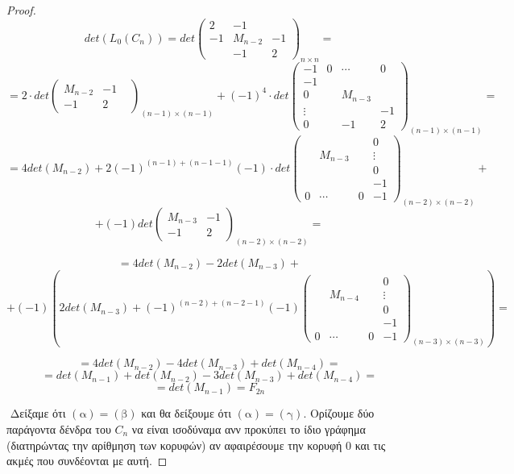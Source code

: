 \documentclass[oneside,a4paper]{article}
\begin{document}
\begin{proof}
	$$det(L_0(C_n)) = det\begin{pmatrix}
		2 & -1 & \\
		-1 & M_{n-2} & -1 \\
		 & -1 & 2
	\end{pmatrix}_{n\times n} = $$
	$$= 2 \cdot det \begin{pmatrix}
		M_{n-2} & -1 & \\
		-1 & 2
	\end{pmatrix}_{(n-1)\times (n-1)} + (-1)^4 \cdot det \begin{pmatrix}
		-1 & 0 & \cdots & 0\\
		-1 &  \\
		 0 & & M_{n-3} \\
		 \vdots & & & -1\\
		 0 & & -1 & 2
	\end{pmatrix}_{(n-1)\times (n-1)} = $$
	$$= 4 det(M_{n-2}) + 2 (-1)^{(n-1) + (n-1-1) }(-1) \cdot det \begin{pmatrix}
		& & & 0 \\
		& M_{n-3}& & \vdots \\ 
		& & & 0 \\
		& & & -1 \\
		0 & \cdots & 0 & -1
	\end{pmatrix}_{(n-2)\times(n-2)} + $$
	$$ + (-1) det\begin{pmatrix}
		M_{n-3} & -1 \\
		-1 & 2 
	\end{pmatrix}_{(n-2)\times(n-2)} = $$

	$$ = 4det(M_{n-2}) - 2det(M_{n-3}) + $$
	$$ + (-1)\left( 2  det(M_{n-3}) + (-1)^{(n-2)+(n-2-1)}(-1) \begin{pmatrix}
		& & & 0 \\
		& M_{n-4}& & \vdots \\
		& & & 0 \\
		& & & -1 \\
		0 & \cdots & 0 & -1
	\end{pmatrix}_{(n-3)\times(n-3)} \right) = $$

	$$ = 4det(M_{n-2}) - 4det(M_{n-3}) + det(M_{n-4})  = $$
	$$ = det(M_{n-1}) + det(M_{n-2}) - 3 det(M_{n-3}) + det(M_{n-4}) = $$
	$$ = det(M_{n-1}) = F_{2n}$$


	$ $\newline
	Δείξαμε ότι $(\text{α}) = (\text{β})$ και θα δείξουμε ότι $(\text{α}) = (\text{γ})$. Ορίζουμε δύο παράγοντα δένδρα του $C_n$ να είναι ισοδύναμα ανν προκύπει το ίδιο γράφημα (διατηρώντας την αρίθμηση των κορυφών) αν αφαιρέσουμε την κορυφή $0$ και τις ακμές που συνδέονται με αυτή.


\end{proof}
\end{document}
